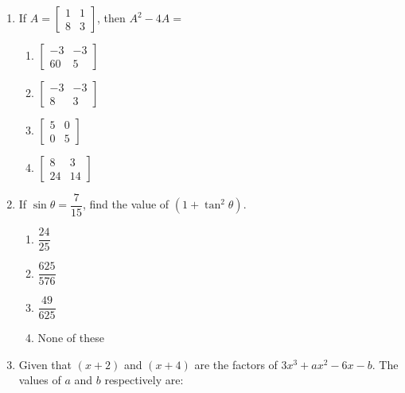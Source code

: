\begin{enumerate}[label=(\roman*)]
    \item If $A = \begin{bmatrix*} 1 & 1 \\ 8 & 3 \end{bmatrix*}$, then 
        $A^2 - 4A =$

        \begin{multicols}{2}
        \begin{enumerate}[label=(\alph*)]
            \item $\begin{bmatrix*} -3 & -3 \\ 60 &  5 \end{bmatrix*}$ 
            \item $\begin{bmatrix*} -3 & -3 \\  8 &  3 \end{bmatrix*}$ 
            \item $\begin{bmatrix*}  5 &  0 \\  0 &  5 \end{bmatrix*}$ 
            \item $\begin{bmatrix*}  8 &  3 \\ 24 & 14 \end{bmatrix*}$ 
        \end{enumerate}
        \end{multicols}

    \item If $\sin \theta = \dfrac{7}{15}$, find the value of $(1 + \tan^2 \theta)$. 

        \begin{multicols}{2}
        \begin{enumerate}[label=(\alph*)]
            \item $\dfrac{24}{25}$ 
            \item $\dfrac{625}{576}$ 
            \item $\dfrac{49}{625}$ 
            \item None of these 
        \end{enumerate}
        \end{multicols}

    \item Given that $(x+2)$ and $(x+4)$ are the factors of 
        $3x^3 + ax^2 - 6x -b$. The values of $a$ and $b$ respectively
        are:


\end{enumerate}
